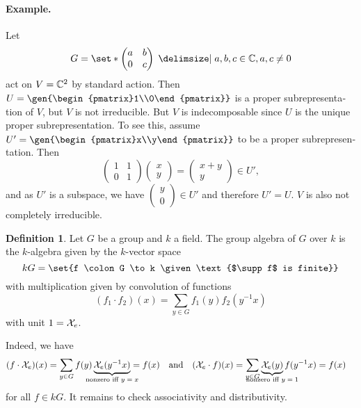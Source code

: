 \documentclass[12pt,a4paper]{scrartcl}
\theoremstyle{cplain}
\theoremstyle{cplain}
\theoremstyle{cplain}
\theoremstyle{definition}
\newtheorem*{deff}{Definition}
\begin{document}
\begin{otherlanguage}{english}
\paragraph{Example.}
Let \[ G = \set*{\begin{pmatrix}a&b\\0&c\end{pmatrix} \given a,b,c \in \IC, a,c \neq 0 } \] act on $V = \mathbb C^2$ by standard action. Then $U = \gen{\begin{pmatrix}1\\0\end{pmatrix}}$ is a proper subrepresentation of $V$, but $V$ is not irreducible. But $V$ is indecomposable since $U$ is the unique proper subrepresentation. To see this, assume $U' = \gen{\begin{pmatrix}x\\y\end{pmatrix}}$ to be a proper subrepresentation. Then \[ \begin{pmatrix}1&1\\0&1\end{pmatrix} \begin{pmatrix}x\\y\end{pmatrix} = \begin{pmatrix}x+y\\y\end{pmatrix} \in U', \] and as $U'$ is a subspace, we have $\begin{pmatrix}y\\0\end{pmatrix} \in U'$ and therefore $U' = U$. $V$ is also not completely irreducible.

\begin{deff}
  Let $G$ be a group and $k$ a field. The group algebra of $G$ over $k$ is the $k$-algebra given by the $k$-vector space \[ kG = \set{f \colon G \to k \given \text{$\supp f$ is finite}} \] with multiplication given by convolution of functions \[ (f_1\cdot f_2)(x) = \sum_{y \in G} f_1(y)f_2(y^{-1}x) \] with unit $1 = \mathcal{X}_e$.
\end{deff}
Indeed, we have
\begin{align*}
  (f\cdot \Xs_e)(x) &= \sum_{y \in G} f(y) \underbrace{\Xs_e(y^{-1}x)}_{\mathclap{\text{nonzero iff $y = x$}}} = f(x)  &&\text{and}
  &(\Xs_e \cdot f)(x) &= \sum_{y \in G} \underbrace{\Xs_e(y)}_{\mathclap{\text{nonzero iff $y = 1$}}}f(y^{-1}x) = f(x)
\end{align*}
for all $f \in kG$. It remains to check associativity and distributivity.


\end{otherlanguage}
\end{document}

